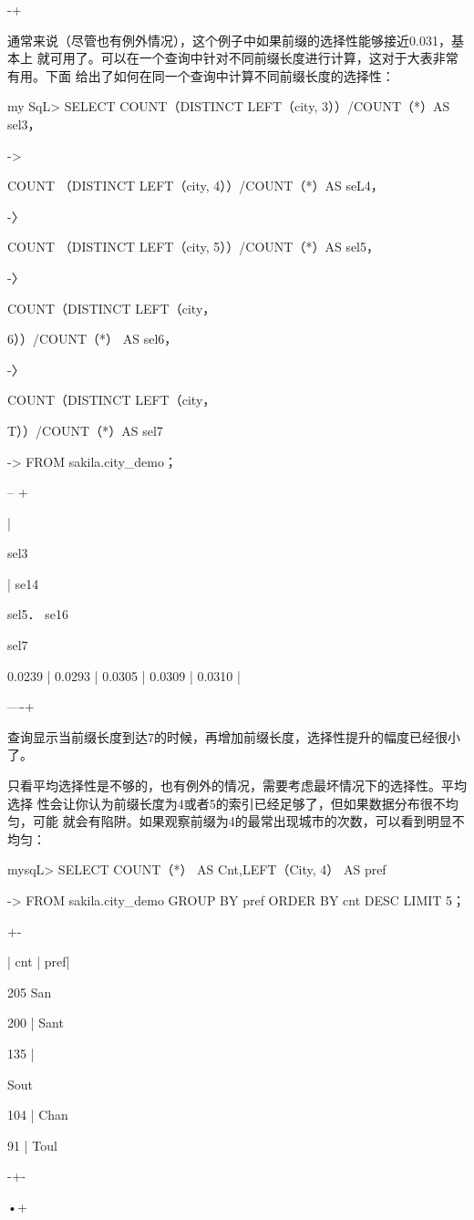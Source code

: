 -+

通常来说（尽管也有例外情况），这个例子中如果前缀的选择性能够接近0.031，基本上
就可用了。可以在一个查询中针对不同前缀长度进行计算，这对于大表非常有用。下面
给出了如何在同一个查询中计算不同前缀长度的选择性：

my SqL> SELECT COUNT（DISTINCT LEFT（city, 3））/COUNT（*）AS sel3，

->

COUNT （DISTINCT LEFT（city, 4））/COUNT（*）AS seL4，

-〉

COUNT （DISTINCT LEFT（city, 5））/COUNT（*）AS sel5，

-〉

COUNT（DISTINCT LEFT（city，

6））/COUNT（*） AS sel6，

-〉

COUNT（DISTINCT LEFT（city，

T））/COUNT（*）AS sel7

-> FROM sakila.city\_demo；

-- +

|

sel3

| se14

sel5． se16

sel7

0.0239 | 0.0293 | 0.0305 | 0.0309 | 0.0310 |

----+

查询显示当前缀长度到达7的时候，再增加前缀长度，选择性提升的幅度已经很小了。

只看平均选择性是不够的，也有例外的情况，需要考虑最坏情况下的选择性。平均选择
性会让你认为前缀长度为4或者5的索引已经足够了，但如果数据分布很不均匀，可能
就会有陷阱。如果观察前缀为4的最常出现城市的次数，可以看到明显不均匀：

mysqL> SELECT COUNT（*） AS Cnt,LEFT（City, 4） AS pref

-> FROM sakila.city\_demo GROUP BY pref ORDER BY cnt DESC LIMIT 5；

+-

| cnt | pref|

205 San

200 | Sant

135 |

Sout

104 | Chan

91 | Toul

-+-

•+

